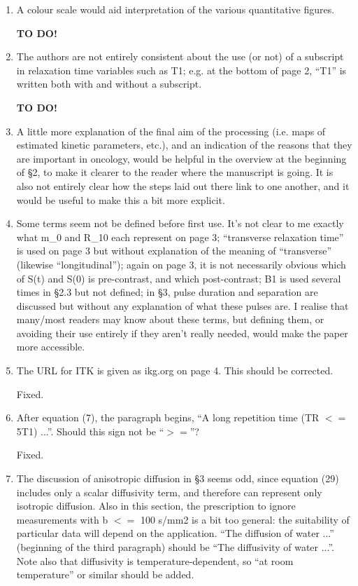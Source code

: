 \documentclass[11pt]{article}
\begin{document}
\begin{enumerate}

\item A colour scale would aid interpretation of the various
  quantitative figures.

  \textbf{TO DO!}

\item The authors are not entirely consistent about the use (or not)
  of a subscript in relaxation time variables such as T1; e.g. at the
  bottom of page 2, ``T1'' is written both with and without a
  subscript.

  \textbf{TO DO!}

\item A little more explanation of the final aim of the processing
  (i.e.  maps of estimated kinetic parameters, etc.), and an
  indication of the reasons that they are important in oncology, would
  be helpful in the overview at the beginning of \S2, to make it
  clearer to the reader where the manuscript is going.  It is also not
  entirely clear how the steps laid out there link to one another, and
  it would be useful to make this a bit more explicit.

\item Some terms seem not be defined before first use.  It's not clear
  to me exactly what m\_0 and R\_10 each represent on page 3;
  ``transverse relaxation time'' is used on page 3 but without
  explanation of the meaning of ``transverse'' (likewise
  ``longitudinal''); again on page 3, it is not necessarily obvious
  which of S(t) and S(0) is pre-contrast, and which post-contrast; B1
  is used several times in \S2.3 but not defined; in \S3, pulse
  duration and separation are discussed but without any explanation of
  what these pulses are. I realise that many/most readers may know
  about these terms, but defining them, or avoiding their use entirely
  if they aren't really needed, would make the paper more accessible.

\item The URL for ITK is given as ikg.org on page 4. This should be
  corrected.

  Fixed.

\item After equation (7), the paragraph begins, ``A long repetition
  time (TR $<=$ 5T1) ...''. Should this sign not be ``$>=$''?

  Fixed.

\item The discussion of anisotropic diffusion in \S3 seems odd, since
  equation (29) includes only a scalar diffusivity term, and therefore
  can represent only isotropic diffusion. Also in this section, the
  prescription to ignore measurements with b $<=$ 100 s/mm2 is a bit
  too general: the suitability of particular data will depend on the
  application. ``The diffusion of water ...'' (beginning of the third
  paragraph) should be ``The diffusivity of water ...''. Note also
  that diffusivity is temperature-dependent, so ``at room
  temperature'' or similar should be added.


\end{enumerate}
\end{document}
